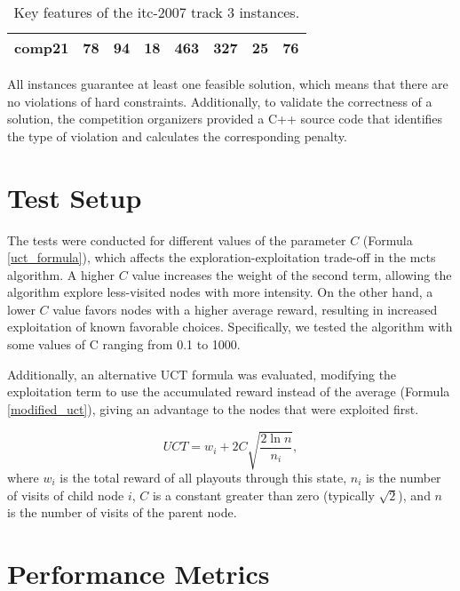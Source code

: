\begin{table}[h!]
\begin{center}
\begin{tabular}{ |c|c|c|c|c|c|c|c| }
comp21                                    & 78                                         & 94                                       & 18                                     & 463                                          & 327                                       & 25                                       & 76 					\\
\hline                                      
\end{tabular}
\caption{Key features of the \ac{itc-2007} track 3 instances.}
\label{itc_instance_features}
\end{center}
\end{table}

All instances guarantee at least one feasible solution, which means that there are no violations of hard constraints. Additionally, to validate the correctness of a solution, the competition organizers provided a C++ source code that identifies the type of violation and calculates the corresponding penalty.

\section{Test Setup}

The tests were conducted for different values of the parameter \(C\) (Formula \ref{uct_formula}), which affects the exploration-exploitation trade-off in the \ac{mcts} algorithm. A higher \(C\) value increases the weight of the second term, allowing the algorithm explore less-visited nodes with more intensity. On the other hand, a lower \(C\) value favors nodes with a higher average reward, resulting in increased exploitation of known favorable choices. Specifically, we tested the algorithm with some values of C ranging from 0.1 to 1000.

Additionally, an alternative UCT formula was evaluated, modifying the exploitation term to use the accumulated reward instead of the average (Formula \ref{modified_uct}), giving an advantage to the nodes that were exploited first.

\begin{equation}
UCT = w_i + 2C\sqrt{\frac{2\ln{n}}{n_i}},\label{modified_uct}
\end{equation} where \(w_i\) is the total reward of all playouts through this state, \(n_i\) is the number of visits of child node \(i\), \(C\) is a constant greater than zero (typically \(\sqrt{2}\)), and \(n\) is the number of visits of the parent node.
	
	
\section{Performance Metrics}

